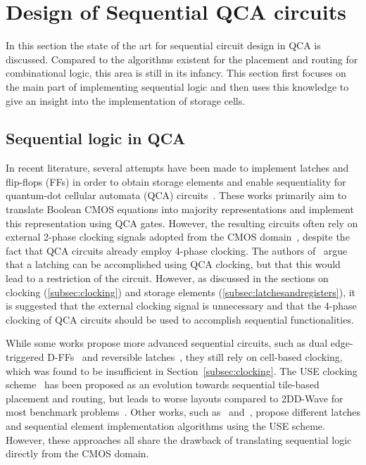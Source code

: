 \section{Design of Sequential QCA circuits}
In this section the state of the art for sequential circuit design in QCA is discussed. Compared to the algorithms existent for the placement and routing for combinational logic, this area is still in its infancy. This section first focuses on the main part of implementing sequential logic and then uses this knowledge to give an insight into the implementation of storage cells. 

\subsection{Sequential logic in QCA}
In recent literature, several attempts have been made to implement latches and flip-flops (FFs) in order to obtain storage elements and enable sequentiality for quantum-dot cellular automata (QCA) circuits~\cite{sequential_cell_one, sequential_cell_two, dual_edge_triggered_FF_cell, sequential_reversible_cell}. These works primarily aim to translate Boolean CMOS equations into majority representations and implement this representation using QCA gates. However, the resulting circuits often rely on external 2-phase clocking signals adopted from the CMOS domain~\cite{sequential_cell_one}, despite the fact that QCA circuits already employ 4-phase clocking. The authors of~\cite{sequential_cell_two} argue that a latching can be accomplished using QCA clocking, but that this would lead to a restriction of the circuit. However, as discussed in the sections on clocking (\ref{subsec:clocking}) and storage elements (\ref{subsec:latchesandregisters}), it is suggested that the external clocking signal is unnecessary and that the 4-phase clocking of QCA circuits should be used to accomplish sequential functionalities.

While some works propose more advanced sequential circuits, such as dual edge-triggered D-FFs~\cite{dual_edge_triggered_FF_cell} and reversible latches~\cite{sequential_reversible_cell}, they still rely on cell-based clocking, which was found to be insufficient in Section~\ref{subsec:clocking}. The USE clocking scheme~\cite{USE} has been proposed as an evolution towards sequential tile-based placement and routing, but leads to worse layouts compared to 2DD-Wave for most benchmark problems~\cite{walter2018exact}. Other works, such as~\cite{sequential_reversible_tile} and~\cite{sequential_tile_CMOS_alg}, propose different latches and sequential element implementation algorithms using the USE scheme. However, these approaches all share the drawback of translating sequential logic directly from the CMOS domain.

